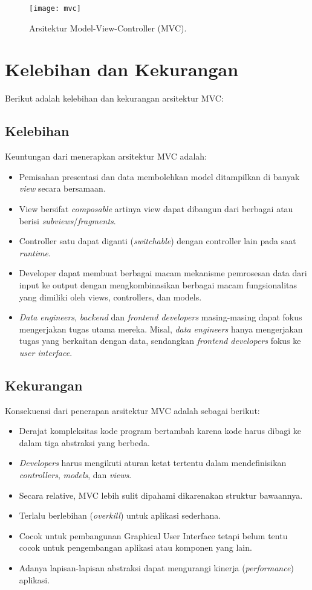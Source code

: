 \begin{figure}[h]
    \centering
    \texttt{[image: mvc]}
    \caption{Arsitektur Model-View-Controller (MVC).}
    \label{fig:mvc}
\end{figure}

\section{Kelebihan dan Kekurangan}
Berikut adalah kelebihan dan kekurangan arsitektur MVC:


\subsection{Kelebihan}
Keuntungan dari menerapkan arsitektur MVC adalah:
\begin{itemize}
\item Pemisahan presentasi dan data membolehkan model ditampilkan di banyak \textit{view} secara bersamaan.
\item View bersifat \textit{composable} artinya view dapat dibangun dari berbagai atau berisi \textit{subviews}/\textit{fragments}.
\item Controller satu dapat diganti (\textit{switchable}) dengan controller lain pada saat \textit{runtime}.
\item Developer dapat membuat berbagai macam mekanisme pemrosesan data dari input ke output dengan mengkombinasikan berbagai macam fungsionalitas yang dimiliki oleh views, controllers, dan models.
\item \textit{Data engineers}, \textit{backend} dan \textit{frontend developers} masing-masing dapat fokus mengerjakan tugas utama mereka. 
Misal, \textit{data engineers} hanya mengerjakan tugas yang berkaitan dengan data, sendangkan \textit{frontend developers} fokus ke \textit{user interface}.
\end{itemize}

\subsection{Kekurangan}
Konsekuensi dari penerapan arsitektur MVC adalah sebagai berikut:
\begin{itemize}
\item Derajat kompleksitas kode program bertambah karena kode harus dibagi ke dalam tiga abstraksi yang berbeda.
\item \textit{Developers} harus mengikuti aturan ketat tertentu dalam mendefinisikan \textit{controllers}, \textit{models}, dan \textit{views}. 
\item Secara relative, MVC lebih sulit dipahami dikarenakan struktur bawaannya.
\item Terlalu berlebihan (\textit{overkill}) untuk aplikasi sederhana.
\item Cocok untuk pembangunan Graphical User Interface tetapi belum tentu cocok untuk pengembangan aplikasi atau komponen yang lain. 
\item Adanya lapisan-lapisan abstraksi dapat mengurangi kinerja (\textit{performance}) aplikasi.
\end{itemize}

